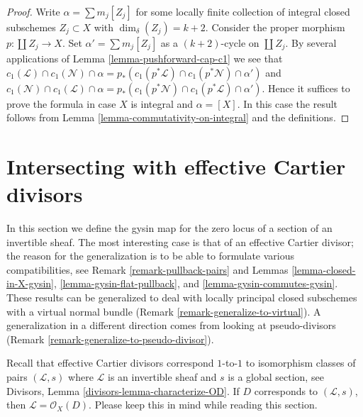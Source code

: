 \begin{proof}
Write $\alpha = \sum m_j[Z_j]$ for some locally finite
collection of integral closed subschemes $Z_j \subset X$
with $\dim_\delta(Z_j) = k + 2$.
Consider the proper morphism $p : \coprod Z_j \to X$.
Set $\alpha' = \sum m_j[Z_j]$ as a $(k + 2)$-cycle on
$\coprod Z_j$. By several applications of
Lemma \ref{lemma-pushforward-cap-c1} we see that
$c_1(\mathcal{L}) \cap c_1(\mathcal{N}) \cap \alpha
= p_*(c_1(p^*\mathcal{L}) \cap c_1(p^*\mathcal{N}) \cap \alpha')$
and
$c_1(\mathcal{N}) \cap c_1(\mathcal{L}) \cap \alpha
= p_*(c_1(p^*\mathcal{N}) \cap c_1(p^*\mathcal{L}) \cap \alpha')$.
Hence it suffices to prove the formula in case $X$ is integral
and $\alpha = [X]$. In this case the result follows
from Lemma \ref{lemma-commutativity-on-integral} and the definitions.
\end{proof}




\section{Intersecting with effective Cartier divisors}
\label{section-intersecting-effective-Cartier}

\noindent
In this section we define the gysin map for the zero locus of a
section of an invertible sheaf. The most interesting case is that
of an effective Cartier divisor; the reason for the generalization
is to be able to formulate various compatibilities, see
Remark \ref{remark-pullback-pairs} and
Lemmas \ref{lemma-closed-in-X-gysin},
\ref{lemma-gysin-flat-pullback}, and
\ref{lemma-gysin-commutes-gysin}.
These results can be generalized to deal with locally principal
closed subschemes with a virtual normal bundle
(Remark \ref{remark-generalize-to-virtual}).
A generalization in a different direction comes from looking
at pseudo-divisors (Remark \ref{remark-generalize-to-pseudo-divisor}).

\medskip\noindent
Recall that effective Cartier divisors correspond $1$-to-$1$ to
isomorphism classes of pairs $(\mathcal{L}, s)$ where $\mathcal{L}$
is an invertible sheaf and $s$ is a global section, see
Divisors, Lemma \ref{divisors-lemma-characterize-OD}.
If $D$ corresponds to $(\mathcal{L}, s)$, then
$\mathcal{L} = \mathcal{O}_X(D)$. Please keep this in mind while
reading this section.

